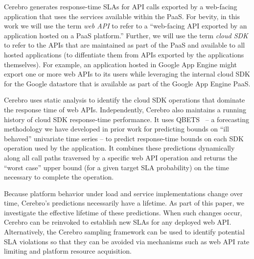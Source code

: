 Cerebro generates response-time SLAs for API calls exported by a web-facing
application
that uses the services available within the PaaS.  For bevity, in this work
we will use the
term \textit{web API} to refer to a ``web-facing API exported by an
application hosted on a PaaS platform.'' Further, 
we will use the term \textit{cloud
SDK} to refer to the APIs that are maintained as part of the PaaS and
available to all hosted applications
(to diffentiate them from APIs exported by the applications themselves).   
For example, an application hosted in Google App Engine might export one or
more web APIs to its users while leveraging the internal cloud SDK for the
Google datastore that is available as part of the Google App Engine PaaS.

Cerebro uses static analysis to identify the cloud SDK operations
that dominate the response time of web APIs.  Independently,
Cerebro also maintains a running history of cloud SDK response-time 
performance.  It uses
QBETS~\cite{Nurmi:2007:QQB:1791551.1791556} -- a forecasting methodology
we have developed in prior work for predicting bounds on ``ill behaved''   
univariate time series -- to predict response-time bounds on each SDK
operation used by the application.  It combines these predictions dynamically
along all call paths traversed by a specific web API operation
and returns the ``worst case''
upper bound (for a given target SLA probability) on the time necessary to 
complete the operation.


Because platform behavior under load and service implementations change over time,
Cerebro's predictions necessarily have a lifetime.  
As part of this paper, we investigate
the effective lifetime of these predictions.  When such changes occur,
Cerebro can be reinvoked to establish new SLAs for any deployed web API.  Alternatively,
the Cerebro sampling framework can be used to identify potential SLA violations
so that they can be avoided via mechanisms such 
as web API rate limiting and platform resource acquisition.


